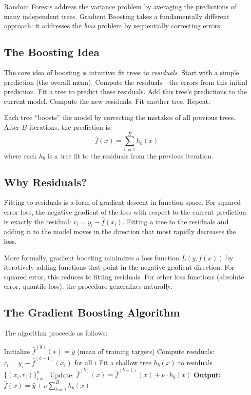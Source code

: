 \documentclass[11pt,a4paper]{article}
\begin{document}
Random Forests address the variance problem by averaging the predictions of many independent trees. Gradient Boosting takes a fundamentally different approach: it addresses the \emph{bias} problem by sequentially correcting errors.

\subsection{The Boosting Idea}

The core idea of boosting is intuitive: fit trees to \emph{residuals}. Start with a simple prediction (the overall mean). Compute the residuals---the errors from this initial prediction. Fit a tree to predict these residuals. Add this tree's predictions to the current model. Compute the new residuals. Fit another tree. Repeat.

Each tree ``boosts'' the model by correcting the mistakes of all previous trees. After $B$ iterations, the prediction is:
\[
\widehat{f}(x) = \sum_{b=1}^{B} h_b(x)
\]
where each $h_b$ is a tree fit to the residuals from the previous iteration.

\subsection{Why Residuals?}

Fitting to residuals is a form of gradient descent in function space. For squared error loss, the negative gradient of the loss with respect to the current prediction is exactly the residual: $r_i = y_i - \widehat{f}(x_i)$. Fitting a tree to the residuals and adding it to the model moves in the direction that most rapidly decreases the loss.

More formally, gradient boosting minimizes a loss function $L(y, f(x))$ by iteratively adding functions that point in the negative gradient direction. For squared error, this reduces to fitting residuals. For other loss functions (absolute error, quantile loss), the procedure generalizes naturally.

\subsection{The Gradient Boosting Algorithm}

The algorithm proceeds as follows:

\begin{algorithm}[H]
\caption{Gradient Boosting for Regression}
\begin{algorithmic}[1]
    \State Initialize $\widehat{f}^{(0)}(x) = \bar{y}$ (mean of training targets)
        \State Compute residuals: $r_i = y_i - \widehat{f}^{(b-1)}(x_i)$ for all $i$
        \State Fit a shallow tree $h_b(x)$ to residuals $\{(x_i, r_i)\}_{i=1}^n$
        \State Update: $\widehat{f}^{(b)}(x) = \widehat{f}^{(b-1)}(x) + \nu \cdot h_b(x)$
    \EndFor
    \State \textbf{Output:} $\widehat{f}(x) = \bar{y} + \nu \sum_{b=1}^{B} h_b(x)$
\end{algorithmic}
\end{algorithm}
\end{document}
